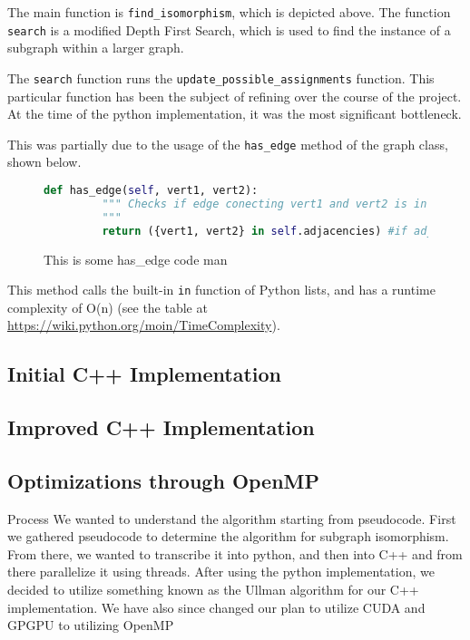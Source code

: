 \documentclass{article}
\begin{document}
  The main function is \texttt{find\_isomorphism}, which is depicted above. The function \texttt{search} is a modified Depth First Search, which is used to find the instance of a subgraph within a larger graph.


  The \texttt{search} function runs  the \texttt{update\_possible\_assignments} function. This particular function has been the subject of refining over the course of the project. At the time of the python implementation, it was the most significant bottleneck.


  This was partially due to the usage of the \texttt{has\_edge} method of the graph class, shown below.


  \begin{figure}[H]
    \centering

    \begin{lstlisting}[language=Python]
    def has_edge(self, vert1, vert2):
         """ Checks if edge conecting vert1 and vert2 is in the graph
         """
         return ({vert1, vert2} in self.adjacencies) #if adjacent, there's an edge

    \end{lstlisting}
    \caption{This is some has_edge code man}
  \end{figure}

  This method calls the built-in \texttt{in} function of Python lists, and has a runtime complexity of O(n) (see the table at \url{https://wiki.python.org/moin/TimeComplexity}).


  \subsection{Initial C++ Implementation}

  \subsection{Improved C++ Implementation}

  \subsection{Optimizations through OpenMP}

Process
We wanted to understand the algorithm starting from pseudocode. First we gathered pseudocode to determine the algorithm for subgraph isomorphism. From there, we wanted to transcribe it into python, and then into C++ and from there parallelize it using threads. After using the python implementation, we decided to utilize something known as the Ullman algorithm for our C++ implementation. We have also since changed our plan to utilize CUDA and GPGPU to utilizing OpenMP
\end{document}
